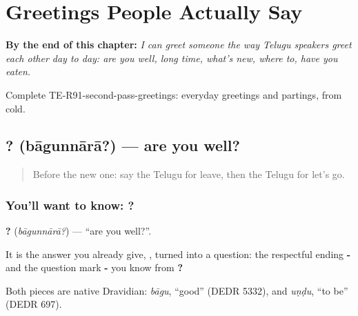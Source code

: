 
\chapter{Greetings People Actually Say}
\label{ch:te-greetings-people-say}

\begin{chapteropening}
\textbf{By the end of this chapter:} \emph{I can greet someone the way Telugu speakers greet each other day to day: are you well, long time, what's new, where to, have you eaten.}

Complete TE-R91-second-pass-greetings: everyday greetings and partings, from cold.
\end{chapteropening}

\section[\texorpdfstring{\te{బాగున్నారా}? (bāgunnārā?)}{బాగున్నారా? (bāgunnārā?)}]{? (bāgunnārā?) — are you well?}

\label{lesson:TE-C91-areyouwell}



\begin{quote}
Before the new one: say the Telugu for leave, then the Telugu for let's go.
\end{quote}

\subsection*{You'll want to know: ?}
\textbf{?} (\emph{bāgunnārā?}) — \textquotedblleft{}are you well?\textquotedblright{}.

It is the answer you already give, \textbf{}, turned into a question: the respectful ending \textbf{-} and the question mark \textbf{-} you know from \textbf{?}

\begin{cousinweb}
Both pieces are native Dravidian: \emph{bāgu}, \textquotedblleft{}good\textquotedblright{} (DEDR 5332), and \emph{uṇḍu}, \textquotedblleft{}to be\textquotedblright{} (DEDR 697).
\end{cousinweb}

